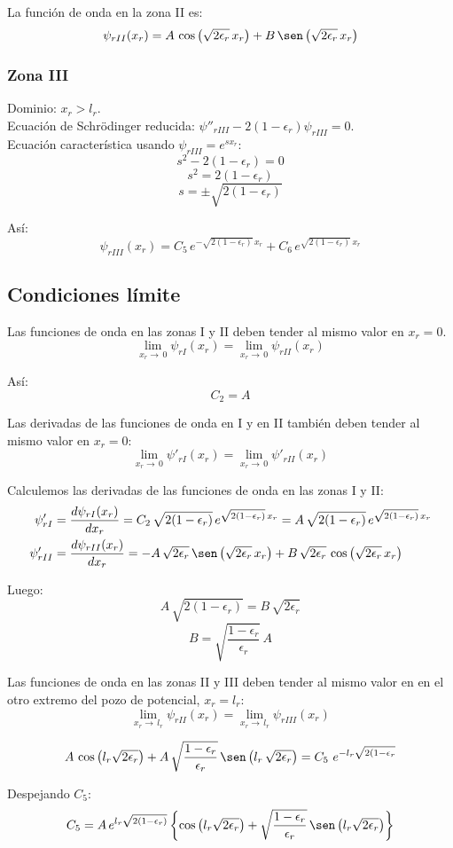 La función de onda en la zona II es:
\[
\psi_{rII}(x_r)
= A\,\cos\left(\sqrt{2\epsilon_r}\,x_r\right)
 + B\,\sen\left(\sqrt{2\epsilon_r}\,x_r\right)
\]

\subsubsection{Zona III}
\noindent
Dominio: $x_r > l_r$.\\
Ecuación de Schrödinger reducida:
$\psi''_{rIII} - 2(1-\epsilon_r)\psi_{rIII}= 0$.\\
Ecuación característica usando $\psi_{rIII}=e^{sx_r}$:
\[
s^2-2(1-\epsilon_r)=0
\]
\[
s^2=2(1-\epsilon_r)
\]
\[
s = \pm\sqrt{2(1-\epsilon_r)}
\]

Así:
\[
\psi_{rIII}(x_r)
 = C_5\,e^{-\sqrt{2(1-\epsilon_r)}\,x_r} + C_6\,e^{\sqrt{2(1-\epsilon_r)}\,x_r}
\]

\subsection{Condiciones límite}

Las funciones de onda en las zonas I y II deben tender al mismo valor en
$x_r=0$.
\[
\lim_{x_r\to\,0} \psi_{rI}(x_r)
=
\lim_{x_r\to\,0} \psi_{rII}(x_r)
\]

Así:
\[
C_2 = A
\]

Las derivadas de las funciones de onda en I y en II también deben tender al
mismo valor en $x_r=0$:
\[
\lim_{x_r\to\,0} \psi'_{rI}(x_r)
=
\lim_{x_r\to\,0} \psi'_{rII}(x_r)
\]

Calculemos las derivadas de las funciones de onda en las zonas I y II:
\begin{align*}
\psi'_{rI} &= \frac{d\psi_{rI}(x_r)}{dx_r}
  = C_2\,\sqrt{2(1-\epsilon_r)}\,e^{\sqrt{2(1-\epsilon_r)}\,x_r}
  = A\,\sqrt{2(1-\epsilon_r)}\,e^{\sqrt{2(1-\epsilon_r)}\,x_r}\\
\psi'_{rII} &= \frac{d\psi_{rII}(x_r)}{dx_r}
  = -A\,\sqrt{2\epsilon_r}\,\sen\left(\sqrt{2\epsilon_r}\,x_r\right)
  + B\,\sqrt{2\epsilon_r}\,\cos\left(\sqrt{2\epsilon_r}\,x_r\right)
\end{align*}

Luego:
\[
A\,\sqrt{2(1-\epsilon_r)} =  B\,\sqrt{2\epsilon_r}
\]
\[
B = \sqrt{\frac{1-\epsilon_r}{\epsilon_r}}\,A
\]

Las funciones de onda en las zonas II y III deben tender al mismo valor en
en el otro extremo del pozo de potencial, $x_r=l_r$:
\[
\lim_{x_r\to\,l_r} \psi_{rII}(x_r)
=
\lim_{x_r\to\,l_r} \psi_{rIII}(x_r)
\]

\[
A\,\cos\left(l_r\sqrt{2\epsilon_r}\right)
 + A\,\sqrt{\frac{1-\epsilon_r}{\epsilon_r}}
   \,\sen\left(l_r\,\sqrt{2\epsilon_r}\right)
=
C_5\,\,e^{-l_r\sqrt{2(1-\epsilon_r}}
\]

Despejando $C_5$:
\begin{equation}
\label{c5_1}
C_5 = A\,e^{l_r\sqrt{2(1-\epsilon_r)}}
  \left\lbrace\cos\left(l_r\sqrt{2\epsilon_r}\right) 
  + \sqrt{\frac{1-\epsilon_r}{\epsilon_r}}\,
         \sen\left(l_r\sqrt{2\epsilon_r}\right)\right\rbrace
\end{equation}


